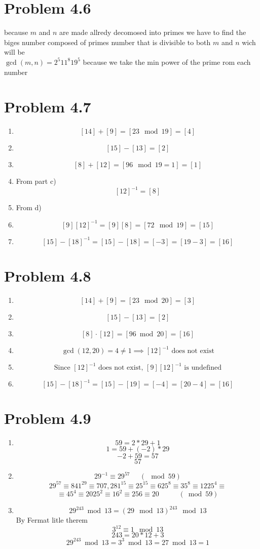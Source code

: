 \documentclass[12pt]{article}
\begin{document}
\begin{enumerate}[label=\alph*)]
\end{enumerate}

\section*{Problem 4.6}
because $m$ and $n$ are made allredy decomosed into primes we have to find the biges number composed of primes number that is divisible to both $m$ and $n$ wich will be 
\\$\gcd(m,n)=2^{5}11^{8}19^{5}$ because we take the min power of the prime rom each number
\section*{Problem 4.7}
\begin{enumerate}[label=\alph*)]
    \item \[[14]+[9]=[23 \mod 19] = [4]\]
    \item \[[15]-[13]=[2]\]
    \item \[[8]+[12]=[96\mod 19 = 1] = [1]\]
    \item From part c) \[[12]^{-1}=[8]\]
    \item From d)
    \item\[[9][12]^{-1}=[9][8]=[72 \mod 19]=[15]\]
    \item\[[15]-[18]^{-1}=[15]-[18]=[-3]=[19-3]=[16]\]
\end{enumerate}
\section*{Problem 4.8}
\begin{enumerate}[label=\alph*)]
    \item \[[14]+[9]=[23 \mod 20] = [3]\]
\item \[[15]-[13]=[2]\]
\item \[[8]\cdot[12]=[96 \bmod 20] = [16]\]
\item \[\gcd(12, 20) = 4 \neq 1 \implies [12]^{-1} \text{ does not exist}\]
\item \[\text{Since }[12]^{-1} \text{ does not exist, }[9][12]^{-1} \text{ is undefined}\]
\item \[[15]-[18]^{-1}=[15]-[19]=[-4]=[20-4]=[16]\]
\end{enumerate}

\section*{Problem 4.9}
\begin{enumerate}[label=\alph*)]
    \item \[59=2*29+1\]
    \[1=59+(-2)*29\]
    \[-2+59=57\]
    \[57\]
    \item \[29^{-1} \equiv 29^{57} \;\;\;\;\; (\mod 59)\]
    \[29^{57} \equiv 841^{29} \equiv 707,281^{15} \equiv 25^{15} \equiv 625^{8} \equiv 35^{8} \equiv 1225^{4} \equiv\]\[\equiv 45^{4} \equiv 2025^2 \equiv 16^2 \equiv 256 \equiv 20 \;\;\;\;\;\;\;\;\;\;(\bmod 59)\]
    \item
    \[29^{243}\bmod 13=(29 \mod 13)^{243}\mod13\]
    By Fermat litle therem  
    \[3^{12}\equiv 1\mod 13\]  
    \[243=20*12+3\]
    \[29^{243}\bmod13=3^3\bmod13=27\bmod13=1\]
\end{enumerate}
\end{document}

